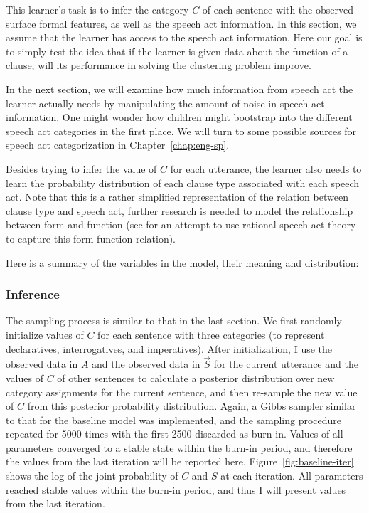 This learner's task is to infer the category $C$ of each sentence with the observed surface formal features, as well as the speech act information. In this section, we assume that the learner has access to the speech act information. Here our goal is to simply test the idea that if the learner is given data about the function of a clause, will its performance in solving the clustering problem improve.

In the next section, we will examine how much information from speech act the learner actually needs by manipulating the amount of noise in speech act information. One might wonder how children might bootstrap into the different speech act categories in the first place. We will turn to some possible sources for speech act categorization in Chapter~\ref{chap:eng-sp}.

Besides trying to infer the value of $C$ for each utterance, the learner also needs to learn the probability distribution of each clause type associated with each speech act. Note that this is a rather simplified representation of the relation between clause type and speech act, further research is needed to model the relationship between form and function (see \cite{gong2021rsaq} for an attempt to use rational speech act theory to capture this form-function relation).



Here is a summary of the variables in the model, their meaning and distribution:



\subsubsection{Inference}
\label{sec:engcl:model:prag:infer}




The sampling process is similar to that in the last section. We first randomly initialize values of $C$ for each sentence with three categories (to represent declaratives, interrogatives, and imperatives). After initialization, I use the observed data in $A$ and the observed data in $\vec{S}$ for the current utterance and the values of $C$ of other sentences to calculate a posterior distribution over new category assignments for the current sentence, and then re-sample the new value of $C$ from this posterior probability distribution. Again, a Gibbs sampler similar to that for the baseline model was implemented, and the sampling procedure repeated for 5000 times with the first 2500 discarded as burn-in. Values of all parameters converged to a stable state within the burn-in period, and therefore the values from the last iteration will be reported here.  Figure~\ref{fig:baseline-iter} shows the log of the joint probability of $C$ and $S$ at each iteration.  All parameters reached stable values within the burn-in period, and thus I will present values from the last iteration. %

